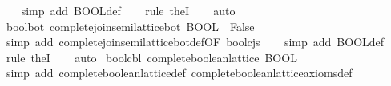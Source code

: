 \begin{isabellebody}
\ \ \isamarkupfalse%
\ {}simp\ add{}\ BOOL{}def{}\isanewline
\ \ \isamarkupfalse%
\ {}rule\ the{}I{}{}\isanewline
\ \ \isamarkupfalse%
\ auto{}%
\endisatagproof
{\isafoldproof}%
%
\isadelimproof
\isanewline
%
\endisadelimproof
\isanewline
{}\isamarkupfalse%
\ bool{}bot{}\ {}complete{}join{}semilattice{}bot\ BOOL\ {}\ False{}\isanewline
%
\isadelimproof
\ \ %
\endisadelimproof
%
\isatagproof
{}\isamarkupfalse%
\ {}simp\ add{}\ complete{}join{}semilattice{}bot{}def{}OF\ bool{}cjs{}{}\isanewline
\ \ \isamarkupfalse%
\ {}simp\ add{}\ BOOL{}def{}\isanewline
\ \ \isamarkupfalse%
\ {}rule\ the{}I{}{}\isanewline
\ \ \isamarkupfalse%
\ auto{}%
\endisatagproof
{\isafoldproof}%
%
\isadelimproof
\isanewline
%
\endisadelimproof
\isanewline
{}\isamarkupfalse%
\ bool{}cbl{}\ {}complete{}boolean{}lattice\ BOOL{}\isanewline
%
\isadelimproof
\ \ %
\endisadelimproof
%
\isatagproof
{}\isamarkupfalse%
\ {}simp\ add{}\ complete{}boolean{}lattice{}def\ complete{}boolean{}lattice{}axioms{}def{}\isanewline

\end{isabellebody}
